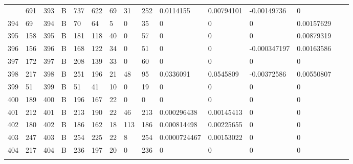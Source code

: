 \begin{longtable}{lllllllllllllll}
\begin{comment}
	393 & 691               & 393 & B   & 737               & 622               & 69                & 31   & 252        & 0.0114155      & 0.00794101     & -0.00149736   & 0            \\
	394 & 69                & 394 & B   & 70                & 64                & 5                 & 0    & 35         & 0              & 0              & 0             & 0.00157629   \\
	395 & 158               & 395 & B   & 181               & 118               & 40                & 0    & 57         & 0              & 0              & 0             & 0.00879319   \\
	396 & 156               & 396 & B   & 168               & 122               & 34                & 0    & 51         & 0              & 0              & -0.000347197  & 0.00163586   \\
	397 & 172               & 397 & B   & 208               & 139               & 33                & 0    & 60         & 0              & 0              & 0             & 0            \\
	398 & 217               & 398 & B   & 251               & 196               & 21                & 48   & 95         & 0.0336091      & 0.0545809      & -0.00372586   & 0.00550807   \\
	399 & 51                & 399 & B   & 51                & 41                & 10                & 0    & 19         & 0              & 0              & 0             & 0            \\
	400 & 189               & 400 & B   & 196               & 167               & 22                & 0    & 0          & 0              & 0              & 0             & 0            \\
	401 & 212               & 401 & B   & 213               & 190               & 22                & 46   & 213        & 0.000296438    & 0.00145413     & 0             & 0            \\
	402 & 180               & 402 & B   & 186               & 162               & 18                & 113  & 186        & 0.000814498    & 0.00225655     & 0             & 0            \\
	403 & 247               & 403 & B   & 254               & 225               & 22                & 8    & 254        & 0.0000724467   & 0.00153022     & 0             & 0            \\
	404 & 217               & 404 & B   & 236               & 197               & 20                & 0    & 236        & 0              & 0              & 0             & 0            \\

\end{comment}
\end{longtable}
